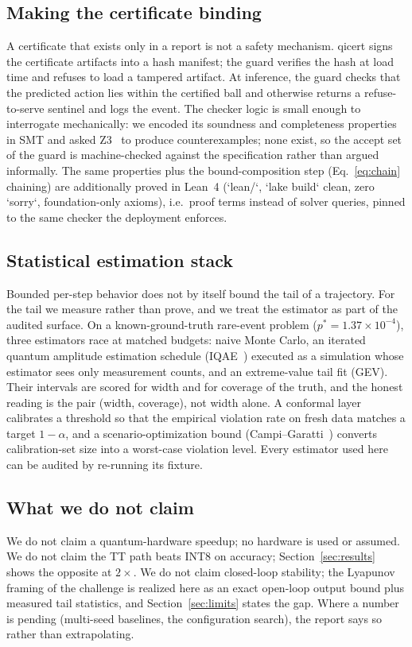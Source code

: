 \documentclass[conference,10pt]{IEEEtran}
\begin{document}
\subsection{Making the certificate binding}
A certificate that exists only in a report is not a safety mechanism. qicert
signs the certificate artifacts into a hash manifest; the guard verifies the
hash at load time and refuses to load a tampered artifact. At inference, the
guard checks that the predicted action lies within the certified ball and
otherwise returns a refuse-to-serve sentinel and logs the event. The checker
logic is small enough to interrogate mechanically: we encoded its soundness
and completeness properties in SMT and asked Z3~\cite{demoura08} to produce counterexamples;
none exist, so the accept set of the guard is machine-checked against the
specification rather than argued informally. The same properties plus the
bound-composition step (Eq.~\eqref{eq:chain} chaining) are additionally
proved in Lean~4 (`lean/`, `lake build` clean, zero `sorry`, foundation-only
axioms), i.e.\ proof terms instead of solver queries, pinned to the same
checker the deployment enforces.

\subsection{Statistical estimation stack}
Bounded per-step behavior does not by itself bound the tail of a trajectory.
For the tail we measure rather than prove, and we treat the estimator as part
of the audited surface. On a known-ground-truth rare-event problem
($p^{*} = 1.37\times10^{-4}$), three estimators race at matched budgets:
naive Monte Carlo, an iterated quantum amplitude estimation schedule
(IQAE~\cite{grinko21}) executed as a simulation whose estimator sees only
measurement counts, and an extreme-value tail fit (GEV). Their intervals are
scored for width and for coverage of the truth, and the honest reading is the
pair (width, coverage), not width alone. A conformal layer~\cite{vovk05,angelopoulos21}
calibrates a threshold so that the empirical violation rate on fresh data
matches a target $1-\alpha$, and a scenario-optimization bound
(Campi--Garatti~\cite{campi08}) converts calibration-set size into a
worst-case violation level. Every estimator used here can be audited by
re-running its fixture.

\subsection{What we do not claim}
We do not claim a quantum-hardware speedup; no hardware is used or assumed.
We do not claim the TT path beats INT8 on accuracy; Section~\ref{sec:results}
shows the opposite at $2\times$. We do not claim closed-loop stability; the
Lyapunov framing of the challenge is realized here as an exact open-loop
output bound plus measured tail statistics, and Section~\ref{sec:limits}
states the gap. Where a number is pending (multi-seed baselines, the
configuration search), the report says so rather than extrapolating.
\end{document}
